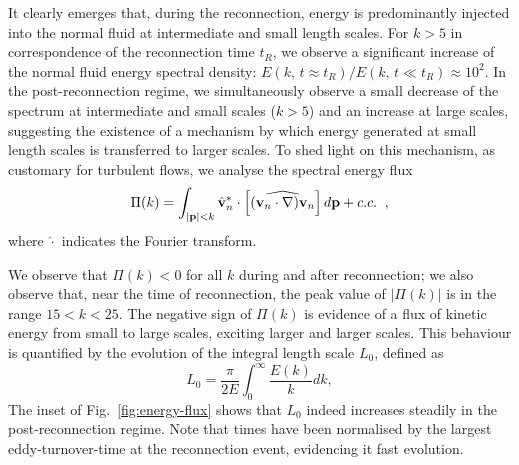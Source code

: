 \documentclass[%
 reprint,
 amsmath,amssymb,
 aps,
 prl,
]{revtex4-2}
\def \v{\mathbf{v}}
\def \k{\mathbf{k}}
\newcommand*{\NOTE}[1]{\textbf{\color{red}[#1]}}
\begin{document}
{It clearly emerges that, during the reconnection, energy is predominantly injected into the normal fluid at intermediate and small length scales. 
For $k>5$ in correspondence of the reconnection time $t_R$,
we observe a significant increase of the normal fluid energy spectral density:
$E(k,\, t\approx t_R)/E(k,\, t\ll t_R) \approx 10^2$. 
%
In the post-reconnection regime, we simultaneously observe a small 
decrease of the spectrum at intermediate 
and small scales ($k > 5$) and an increase at large scales, 
suggesting the existence of a mechanism by 
which energy generated at small length scales is transferred to larger scales. 
To shed light on this mechanism, as customary for turbulent flows, we analyse the spectral energy flux 
\begin{equation}
    \Pi(k)=\int_{|{\bf p}|<k}  \hat{\mathbf{v}}_n^*\cdot \left [\widehat{(\v_n\cdot\nabla)\v_n} \right ]d {\bf p} +c.c. \;\; ,
\end{equation}
where $\widehat{\cdot}$ indicates the Fourier transform.

We observe that $\Pi(k) < 0$ for all $k$ during and after reconnection;
we also observe that, near the time of reconnection,
the peak value of $|\Pi(k)|$ is in the range $15 < k < 25$.
%
The negative sign of $\Pi(k)$ is evidence of a flux of kinetic  energy from small to large scales, exciting larger and larger scales. %
This behaviour is quantified by the evolution of the integral length scale $L_0$, defined as
\begin{equation}
    L_0 = \frac{\pi}{2 E}\int_0^{\infty}\frac{E(k)}{k}dk, %
\end{equation}
The inset of Fig.~\ref{fig:energy-flux} shows that
$L_0$ indeed  increases steadily in the post-reconnection regime. Note that times have been normalised by the largest eddy-turnover-time at the reconnection event, evidencing  it fast evolution.

}
\end{document}
